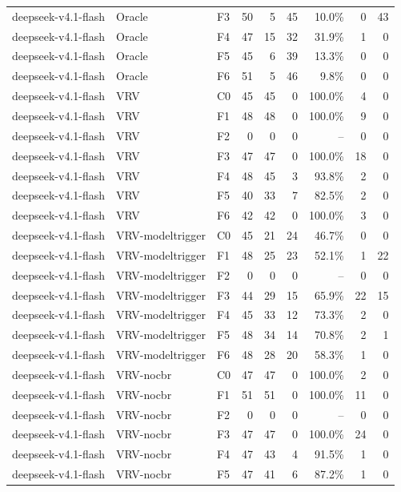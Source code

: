 \begin{tabular}{lllrrrrrr}
deepseek-v4.1-flash & Oracle & F3 & 50 & 5 & 45 & 10.0\% & 0 & 43 \\
deepseek-v4.1-flash & Oracle & F4 & 47 & 15 & 32 & 31.9\% & 1 & 0 \\
deepseek-v4.1-flash & Oracle & F5 & 45 & 6 & 39 & 13.3\% & 0 & 0 \\
deepseek-v4.1-flash & Oracle & F6 & 51 & 5 & 46 & 9.8\% & 0 & 0 \\
deepseek-v4.1-flash & VRV & C0 & 45 & 45 & 0 & 100.0\% & 4 & 0 \\
deepseek-v4.1-flash & VRV & F1 & 48 & 48 & 0 & 100.0\% & 9 & 0 \\
deepseek-v4.1-flash & VRV & F2 & 0 & 0 & 0 & -- & 0 & 0 \\
deepseek-v4.1-flash & VRV & F3 & 47 & 47 & 0 & 100.0\% & 18 & 0 \\
deepseek-v4.1-flash & VRV & F4 & 48 & 45 & 3 & 93.8\% & 2 & 0 \\
deepseek-v4.1-flash & VRV & F5 & 40 & 33 & 7 & 82.5\% & 2 & 0 \\
deepseek-v4.1-flash & VRV & F6 & 42 & 42 & 0 & 100.0\% & 3 & 0 \\
deepseek-v4.1-flash & VRV-modeltrigger & C0 & 45 & 21 & 24 & 46.7\% & 0 & 0 \\
deepseek-v4.1-flash & VRV-modeltrigger & F1 & 48 & 25 & 23 & 52.1\% & 1 & 22 \\
deepseek-v4.1-flash & VRV-modeltrigger & F2 & 0 & 0 & 0 & -- & 0 & 0 \\
deepseek-v4.1-flash & VRV-modeltrigger & F3 & 44 & 29 & 15 & 65.9\% & 22 & 15 \\
deepseek-v4.1-flash & VRV-modeltrigger & F4 & 45 & 33 & 12 & 73.3\% & 2 & 0 \\
deepseek-v4.1-flash & VRV-modeltrigger & F5 & 48 & 34 & 14 & 70.8\% & 2 & 1 \\
deepseek-v4.1-flash & VRV-modeltrigger & F6 & 48 & 28 & 20 & 58.3\% & 1 & 0 \\
deepseek-v4.1-flash & VRV-nocbr & C0 & 47 & 47 & 0 & 100.0\% & 2 & 0 \\
deepseek-v4.1-flash & VRV-nocbr & F1 & 51 & 51 & 0 & 100.0\% & 11 & 0 \\
deepseek-v4.1-flash & VRV-nocbr & F2 & 0 & 0 & 0 & -- & 0 & 0 \\
deepseek-v4.1-flash & VRV-nocbr & F3 & 47 & 47 & 0 & 100.0\% & 24 & 0 \\
deepseek-v4.1-flash & VRV-nocbr & F4 & 47 & 43 & 4 & 91.5\% & 1 & 0 \\
deepseek-v4.1-flash & VRV-nocbr & F5 & 47 & 41 & 6 & 87.2\% & 1 & 0 \\

\end{tabular}
